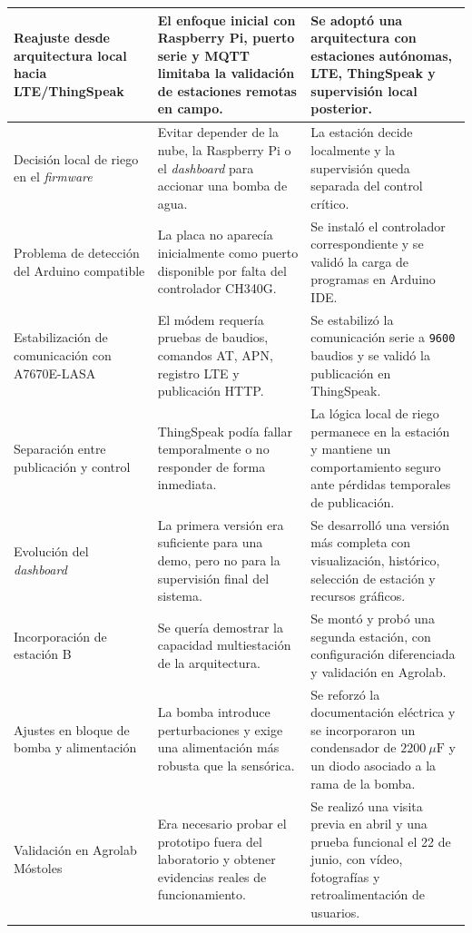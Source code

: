 \begin{longtable}{|p{}|p{}|p{}|}
Reajuste desde arquitectura local hacia LTE/ThingSpeak & El enfoque inicial con Raspberry Pi, puerto serie y MQTT limitaba la validación de estaciones remotas en campo. & Se adoptó una arquitectura con estaciones autónomas, LTE, ThingSpeak y supervisión local posterior. \\
\hline
Decisión local de riego en el \textit{firmware} & Evitar depender de la nube, la Raspberry Pi o el \textit{dashboard} para accionar una bomba de agua. & La estación decide localmente y la supervisión queda separada del control crítico. \\
\hline
Problema de detección del Arduino compatible & La placa no aparecía inicialmente como puerto disponible por falta del controlador CH340G. & Se instaló el controlador correspondiente y se validó la carga de programas en Arduino IDE. \\
\hline
Estabilización de comunicación con A7670E-LASA & El módem requería pruebas de baudios, comandos AT, APN, registro LTE y publicación HTTP. & Se estabilizó la comunicación serie a \texttt{9600} baudios y se validó la publicación en ThingSpeak. \\
\hline
Separación entre publicación y control & ThingSpeak podía fallar temporalmente o no responder de forma inmediata. & La lógica local de riego permanece en la estación y mantiene un comportamiento seguro ante pérdidas temporales de publicación. \\
\hline
Evolución del \textit{dashboard} & La primera versión era suficiente para una demo, pero no para la supervisión final del sistema. & Se desarrolló una versión más completa con visualización, histórico, selección de estación y recursos gráficos. \\
\hline
Incorporación de estación B & Se quería demostrar la capacidad multiestación de la arquitectura. & Se montó y probó una segunda estación, con configuración diferenciada y validación en Agrolab. \\
\hline
Ajustes en bloque de bomba y alimentación & La bomba introduce perturbaciones y exige una alimentación más robusta que la sensórica. & Se reforzó la documentación eléctrica y se incorporaron un condensador de \(2200~\mu\mathrm{F}\) y un diodo asociado a la rama de la bomba. \\
\hline
Validación en Agrolab Móstoles & Era necesario probar el prototipo fuera del laboratorio y obtener evidencias reales de funcionamiento. & Se realizó una visita previa en abril y una prueba funcional el 22 de junio, con vídeo, fotografías y retroalimentación de usuarios. \\
\hline
\end{longtable}

